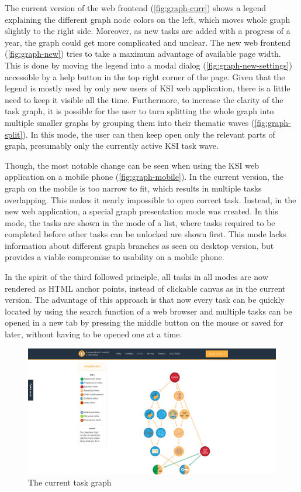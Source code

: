 \documentclass[
  digital, %
  oneside, %
  lof,     %
  nolot,     %
]{fithesis4}
\begin{document}
{The current version of the web frontend (\autoref{fig:graph-curr}) shows a legend explaining the different graph node colors on the left, which moves whole graph slightly to the right side. Moreover, as new tasks are added with a progress of a year, the graph could get more complicated and unclear. The new web frontend (\autoref{fig:graph-new}) tries to take a maximum advantage of available page width. This is done by moving the legend into a modal dialog (\autoref{fig:graph-new-settings}) accessible by a help button in the top right corner of the page. Given that the legend is mostly used by only new users of KSI web application, there is a little need to keep it visible all the time. Furthermore, to increase the clarity of the task graph, it is possible for the user to turn splitting the whole graph into multiple smaller graphs by grouping them into their thematic waves (\autoref{fig:graph-split}). In this mode, the user can then keep open only the relevant parts of graph, presumably only the currently active KSI task wave.

Though, the most notable change can be seen when using the KSI web application on a mobile phone (\autoref{fig:graph-mobile}). In the current version, the graph on the mobile is too narrow to fit, which results in multiple tasks overlapping. This makes it nearly impossible to open correct task. Instead, in the new web application, a special graph presentation mode was created. In this mode, the tasks are shown in the mode of a list, where tasks required to be completed before other tasks can be unlocked are shown first. This mode lacks information about different graph branches as seen on desktop version, but provides a viable compromise to usability on a mobile phone.

In the spirit of the third followed principle, all tasks in all modes are now rendered as HTML anchor points, instead of clickable canvas as in the current version. The advantage of this approach is that now every task can be quickly located by using the search function of a web browser and multiple tasks can be opened in a new tab by pressing the middle button on the mouse or saved for later, without having to be opened one at a time.

\begin{figure}
\includegraphics[width=\textwidth]{assets/img/graph_curr}
\caption{The current task graph}
\label{fig:graph-curr}
\end{figure}

}
\end{document}
